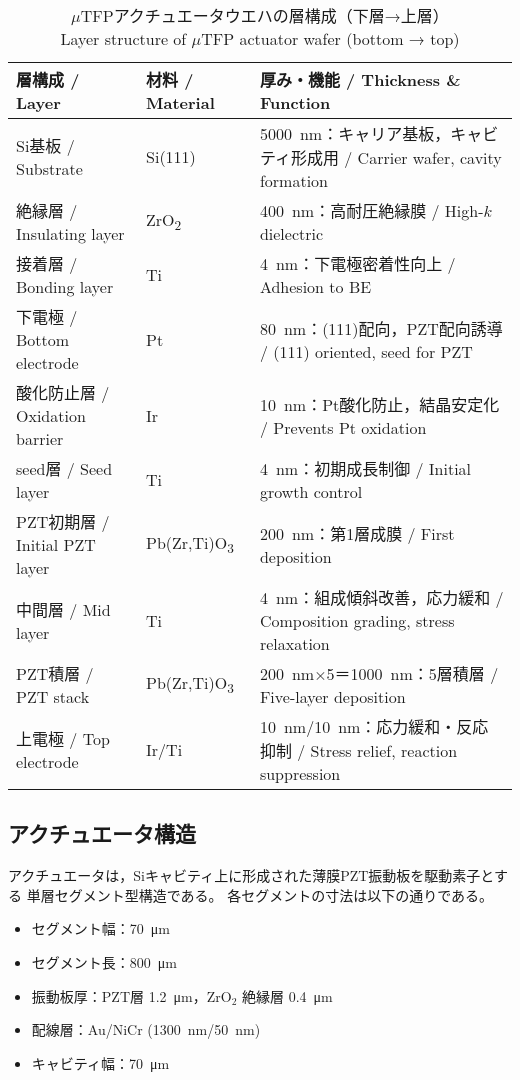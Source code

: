 \documentclass[conference]{IEEEtran}
\begin{document}
\begin{table*}[t]
  \centering
  \caption{%
    $\mu$TFPアクチュエータウエハの層構成（下層→上層）\\
    Layer structure of $\mu$TFP actuator wafer (bottom → top)
  }
  \label{tab:layer-structure}
  \vspace{4pt}
  \setlength{\tabcolsep}{7pt}
  \renewcommand{\arraystretch}{1.15}
  \begin{tabular*}{\textwidth}{@{\extracolsep{\fill}} l l l @{}}
    \hline
    \textbf{層構成 / Layer} & \textbf{材料 / Material} & \textbf{厚み・機能 / Thickness \& Function} \\
    \hline
    Si基板 / Substrate & Si(111) & \SI{5000}{nm}：キャリア基板，キャビティ形成用 / Carrier wafer, cavity formation \\
    絶縁層 / Insulating layer & ZrO\textsubscript{2} & \SI{400}{nm}：高耐圧絶縁膜 / High-$k$ dielectric \\
    接着層 / Bonding layer & Ti & \SI{4}{nm}：下電極密着性向上 / Adhesion to BE \\
    下電極 / Bottom electrode & Pt & \SI{80}{nm}：(111)配向，PZT配向誘導 / (111) oriented, seed for PZT \\
    酸化防止層 / Oxidation barrier & Ir & \SI{10}{nm}：Pt酸化防止，結晶安定化 / Prevents Pt oxidation \\
    seed層 / Seed layer & Ti & \SI{4}{nm}：初期成長制御 / Initial growth control \\
    PZT初期層 / Initial PZT layer & Pb(Zr,Ti)O\textsubscript{3} & \SI{200}{nm}：第1層成膜 / First deposition \\
    中間層 / Mid layer & Ti & \SI{4}{nm}：組成傾斜改善，応力緩和 / Composition grading, stress relaxation \\
    PZT積層 / PZT stack & Pb(Zr,Ti)O\textsubscript{3} & \SI{200}{nm}×5＝\SI{1000}{nm}：5層積層 / Five-layer deposition \\
    上電極 / Top electrode & Ir/Ti & \SI{10}{nm}/\SI{10}{nm}：応力緩和・反応抑制 / Stress relief, reaction suppression \\
    \hline
  \end{tabular*}
  \vspace{-4pt}
\end{table*}

\subsection{アクチュエータ構造}
アクチュエータは，Siキャビティ上に形成された薄膜PZT振動板を駆動素子とする
単層セグメント型構造である。
各セグメントの寸法は以下の通りである。
\begin{itemize}
  \item セグメント幅：\SI{70}{\micro m}
  \item セグメント長：\SI{800}{\micro m}
  \item 振動板厚：PZT層 \SI{1.2}{\micro m}，ZrO$_2$ 絶縁層 \SI{0.4}{\micro m}
  \item 配線層：Au/NiCr (\SI{1300}{nm}/\SI{50}{nm})
  \item キャビティ幅：\SI{70}{\micro m}
\end{itemize}
\end{document}
